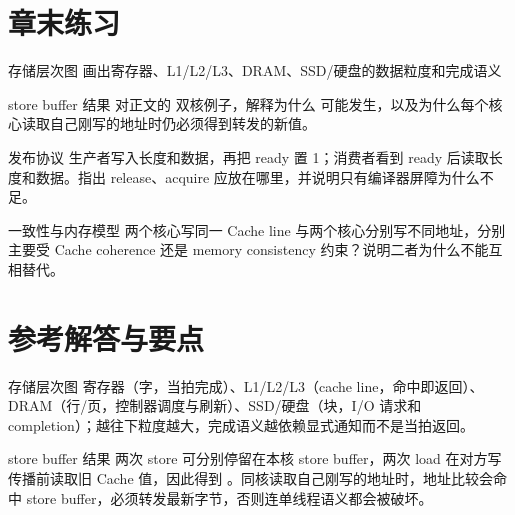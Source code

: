 \section*{章末练习}

\begin{chapterexercise}{存储层次图}
画出寄存器、L1/L2/L3、DRAM、SSD/硬盘的数据粒度和完成语义
\end{chapterexercise}

\begin{chapterexercise}{store buffer 结果}
对正文的  双核例子，解释为什么  可能发生，以及为什么每个核心读取自己刚写的地址时仍必须得到转发的新值。
\end{chapterexercise}

\begin{chapterexercise}{发布协议}
生产者写入长度和数据，再把 ready 置 1；消费者看到 ready 后读取长度和数据。指出 release、acquire 应放在哪里，并说明只有编译器屏障为什么不足。
\end{chapterexercise}

\begin{chapterexercise}{一致性与内存模型}
两个核心写同一 Cache line 与两个核心分别写不同地址，分别主要受 Cache coherence 还是 memory consistency 约束？说明二者为什么不能互相替代。
\end{chapterexercise}

\section*{参考解答与要点}

\begin{chapteranswer}{存储层次图}
寄存器（字，当拍完成）、L1/L2/L3（cache line，命中即返回）、DRAM（行/页，控制器调度与刷新）、SSD/硬盘（块，I/O 请求和 completion）；越往下粒度越大，完成语义越依赖显式通知而不是当拍返回。
\end{chapteranswer}

\begin{chapteranswer}{store buffer 结果}
两次 store 可分别停留在本核 store buffer，两次 load 在对方写传播前读取旧 Cache 值，因此得到 。同核读取自己刚写的地址时，地址比较会命中 store buffer，必须转发最新字节，否则连单线程语义都会被破坏。
\end{chapteranswer}

